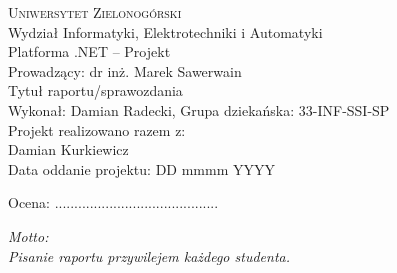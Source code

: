 \documentclass[10pt,a4paper]{article}
\begin{document}
\pagestyle{empty}

%
%

\begin{center}
\textsc{\Huge{Uniwersytet Zielonogórski}}\\
\LARGE{Wydział Informatyki, Elektrotechniki i Automatyki}\\
\vspace{0.5cm}
\Large{Platforma .NET -- Projekt}\\
Prowadzący: dr inż. Marek Sawerwain\\ \vspace{1cm}
\LARGE{Tytuł raportu/sprawozdania}\\
\vspace{0.5cm} 
\Large{Wykonał: Damian Radecki, Grupa dziekańska: 33-INF-SSI-SP} \\
\Large{Projekt realizowano razem z: \\ Damian Kurkiewicz}\\
\Large{Data oddanie projektu: DD mmmm YYYY}
\vspace{1cm}
\begin{flushleft}
	Ocena: ..........................................
\end{flushleft}
\vspace{1cm}
\end{center}



%
%

\begin{multicols}{2}
	\footnotesize
	\tableofcontents
\end{multicols}


%
%

\begin{multicols}{2}
	\footnotesize
	\lstlistoflistings
\end{multicols}




\noindent\makebox[\linewidth]{\rule{0.6\paperwidth}{0.4pt}}

\begin{flushleft}
	\emph{Motto:}\\
	\textit{Pisanie raportu przywilejem każdego studenta.}
\end{flushleft}

\end{document}

